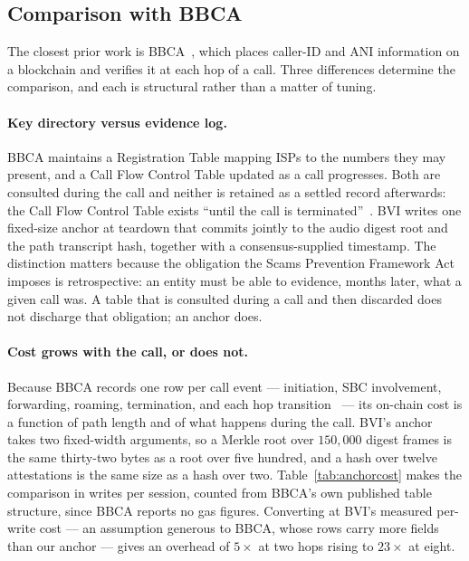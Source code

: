 %



\subsection{Comparison with BBCA}

The closest prior work is BBCA~\cite{bbca}, which places caller-ID and ANI
information on a blockchain and verifies it at each hop of a call. Three
differences determine the comparison, and each is structural rather than a
matter of tuning.

\paragraph{Key directory versus evidence log.}
BBCA maintains a Registration Table mapping ISPs to the numbers they may
present, and a Call Flow Control Table updated as a call progresses. Both are
consulted during the call and neither is retained as a settled record
afterwards: the Call Flow Control Table exists ``until the call is
terminated''~\cite[Sec.~III.A]{bbca}. BVI writes one fixed-size anchor at
teardown that commits jointly to the audio digest root and the path transcript
hash, together with a consensus-supplied timestamp. The distinction matters
because the obligation the Scams Prevention Framework Act imposes is
retrospective: an entity must be able to evidence, months later, what a given
call was. A table that is consulted during a call and then discarded does not
discharge that obligation; an anchor does.

\paragraph{Cost grows with the call, or does not.}
Because BBCA records one row per call event --- initiation, SBC involvement,
forwarding, roaming, termination, and each hop transition~\cite[Fig.~4]{bbca}
--- its on-chain cost is a function of path length and of what happens during
the call. BVI's anchor takes two fixed-width arguments, so a Merkle root over
$150{,}000$ digest frames is the same thirty-two bytes as a root over five
hundred, and a hash over twelve attestations is the same size as a hash over
two. Table~\ref{tab:anchorcost} makes the comparison in writes per session,
counted from BBCA's own published table structure, since BBCA reports no gas
figures. Converting at BVI's measured per-write cost --- an assumption
generous to BBCA, whose rows carry more fields than our anchor --- gives an
overhead of $5\times$ at two hops rising to $23\times$ at eight.

